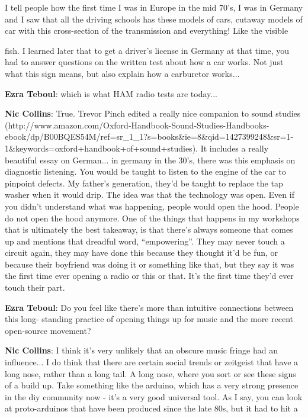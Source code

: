 I tell people how the first time I was in Europe in the mid 70’s, I was in Germany and I saw that all the driving schools has these models of cars, cutaway models of car with this cross-section of the transmission and everything! Like the visible
									
fish. I learned later that to get a driver’s license in Germany at that time, you had to answer questions on the written test about how a car works. Not just what this sign means, but also explain how a carburetor works...
					
\textbf{Ezra Teboul}: which is what HAM radio tests are today...
					
\textbf{Nic Collins}: True. Trevor Pinch edited a really nice companion to sound studies (http://www.amazon.com/Oxford-Handbook-Sound-Studies-Handbooks-ebook/dp/B00BQES54M/ref=sr_1_1?s=books&ie=8&qid=1427399248&sr=1-1&keywords=oxford+handbook+of+sound+studies). It includes a really beautiful essay on German... in germany in the 30’s, there was this emphasis on diagnostic listening. You would be taught to listen to the engine of the car to pinpoint defects. My father’s generation, they’d be taught to replace the tap washer when it would drip. The idea was that the technology was open. Even if you didn’t understand what was happening, people would open the hood. People do not open the hood anymore. One of the things that happens in my workshops that is ultimately the best takeaway, is that there’s always someone that comes up and mentions that dreadful word, ``empowering''. They may never touch a circuit again, they may have done this because they thought it’d be fun, or because their boyfriend was doing it or something like that, but they say it was the first time ever opening a radio or this or that. It’s the first time they’d ever touch their part.
					
\textbf{Ezra Teboul}: Do you feel like there’s more than intuitive connections between this long- standing practice of opening things up for music and the more recent open-source movement?
					
\textbf{Nic Collins}: I think it’s very unlikely that an obscure music fringe had an influence... I do think that there are certain social trends or zeitgeist that have a long nose, rather than a long tail. A long nose, where you sort or see these signs of a build up. Take something like the arduino, which has a very strong presence in the diy community now - it’s a very good universal tool. As I say, you can look at proto-arduinos that have been produced since the late 80s, but it had to hit a
									
